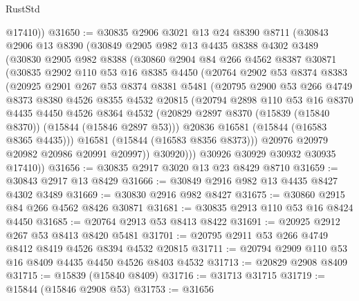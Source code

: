 \begin{lexlean}{RustStd}
\begin{coremodule}
        @17410))
@31650 := @30835
    @2906
    @3021
    @13
    @24
    @8390
    @8711
    (@30843
      @2906
      @13
      @8390
      (@30849
        @2905
        @982
        @13
        @4435
        @8388
        @4302
        @3489
        (@30830
          @2905
          @982
          @8388
          (@30860
            @2904
            @84
            @266
            @4562
            @8387
            @30871
            (@30835
              @2902
              @110
              @53
              @16
              @8385
              @4450
              (@20764
                @2902
                @53
                @8374
                @8383
                (@20925
                  @2901
                  @267
                  @53
                  @8374
                  @8381
                  @5481
                  (@20795
                    @2900
                    @53
                    @266
                    @4749
                    @8373
                    @8380
                    @4526
                    @8355
                    @4532
                    @20815
                    (@20794
                      @2898
                      @110
                      @53
                      @16
                      @8370
                      @4435
                      @4450
                      @4526
                      @8364
                      @4532
                      (@20829 @2897 @8370 (@15839 (@15840 @8370)) (@15844 (@15846 @2897 @53)))
                      @20836
                      @16581
                      (@15844 (@16583 @8365 @4435)))
                    @16581
                    (@15844 (@16583 @8356 @8373)))
                  @20976
                  @20979
                  @20982
                  @20986
                  @20991
                  @20997))
              @30920)))
        @30926
        @30929
        @30932
        @30935
        @17410))
@31656 := @30835 @2917 @3020 @13 @23 @8429 @8710
@31659 := @30843 @2917 @13 @8429
@31666 := @30849 @2916 @982 @13 @4435 @8427 @4302 @3489
@31669 := @30830 @2916 @982 @8427
@31675 := @30860 @2915 @84 @266 @4562 @8426 @30871
@31681 := @30835 @2913 @110 @53 @16 @8424 @4450
@31685 := @20764 @2913 @53 @8413 @8422
@31691 := @20925 @2912 @267 @53 @8413 @8420 @5481
@31701 := @20795 @2911 @53 @266 @4749 @8412 @8419 @4526 @8394 @4532 @20815
@31711 := @20794 @2909 @110 @53 @16 @8409 @4435 @4450 @4526 @8403 @4532
@31713 := @20829 @2908 @8409
@31715 := @15839 (@15840 @8409)
@31716 := @31713 @31715
@31719 := @15844 (@15846 @2908 @53)
@31753 := @31656

\end{coremodule}
\end{lexlean}
